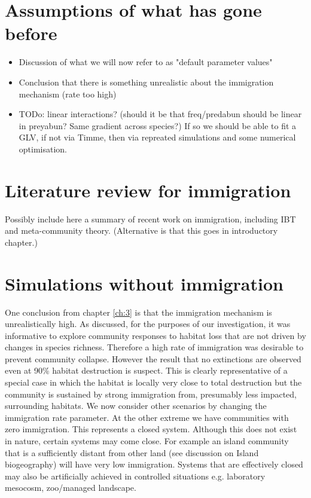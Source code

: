 \section{Assumptions of what has gone before}

\begin{itemize}
	\item Discussion of what we will now refer to as "default parameter values"
	\item Conclusion that there is something unrealistic about the immigration mechanism (rate too high)
	
	\item TODo: linear interactions? (should it be that freq/predabun should be linear in preyabun? Same gradient across species?) If so we should be able to fit a GLV, if not via Timme, then via repreated simulations and some numerical optimisation.
\end{itemize}

\cite{ripple2012trophic}

\section{Literature review for immigration}

Possibly include here a summary of recent work on immigration, including IBT and meta-community theory. (Alternative is that this goes in introductory chapter.)

\section{Simulations without immigration}
\label{sec:no_immigration}

One conclusion from chapter \ref{ch:3} is that the immigration mechanism is unrealistically high. As discussed, for the purposes of our investigation, it was informative to explore community responses to habitat loss that are not driven by changes in species richness. Therefore a high rate of immigration was desirable to prevent community collapse. However the result that no extinctions are observed even at 90\% habitat destruction is suspect. This is clearly representative of a special case in which the habitat is locally very close to total destruction but the community is sustained by strong immigration from, presumably less impacted, surrounding habitats. We now consider other scenarios by changing the immigration rate parameter. At the other extreme we have communities with zero immigration. This represents a closed system. Although this does not exist in nature, certain systems may come close. For example an island community that is a sufficiently distant from other land (see discussion on Island biogeography) will have very low immigration. Systems that are effectively closed may also be artificially achieved in controlled situations e.g. laboratory mesocosm, zoo/managed landscape.

